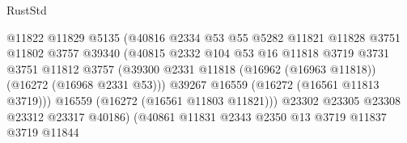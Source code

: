\begin{lexlean}{RustStd}
\begin{coremodule}
                                          @11822
                                          @11829
                                          @5135
                                          (@40816
                                            @2334
                                            @53
                                            @55
                                            @5282
                                            @11821
                                            @11828
                                            @3751
                                            @11802
                                            @3757
                                            @39340
                                            (@40815
                                              @2332
                                              @104
                                              @53
                                              @16
                                              @11818
                                              @3719
                                              @3731
                                              @3751
                                              @11812
                                              @3757
                                              (@39300
                                                @2331
                                                @11818
                                                (@16962 (@16963 @11818))
                                                (@16272 (@16968 @2331 @53)))
                                              @39267
                                              @16559
                                              (@16272 (@16561 @11813 @3719)))
                                            @16559
                                            (@16272 (@16561 @11803 @11821)))
                                          @23302
                                          @23305
                                          @23308
                                          @23312
                                          @23317
                                          @40186)
                                        (@40861
                                          @11831
                                          @2343
                                          @2350
                                          @13
                                          @3719
                                          @11837
                                          @3719
                                          @11844

\end{coremodule}
\end{lexlean}
